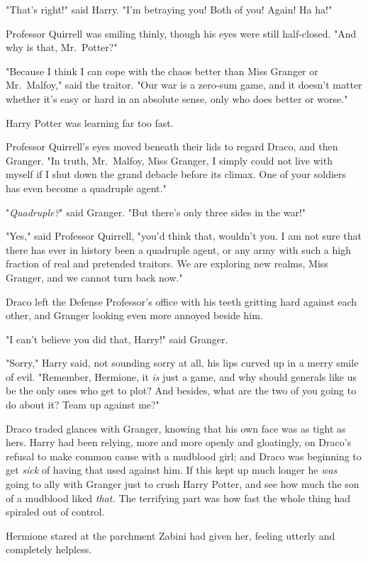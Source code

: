 "That's right!" said Harry. "I'm betraying you! Both of you! Again! Ha ha!"

Professor Quirrell was smiling thinly, though his eyes were still half-closed. 
"And why is that, Mr.~Potter?"

"Because I think I can cope with the chaos better than Miss Granger or 
Mr.~Malfoy," said the traitor. "Our war is a zero-sum game, and it doesn't 
matter whether it's easy or hard in an absolute sense, only who does better or 
worse."

Harry Potter was learning far too fast.

Professor Quirrell's eyes moved beneath their lids to regard Draco, and then 
Granger. "In truth, Mr.~Malfoy, Miss Granger, I simply could not live with 
myself if I shut down the grand debacle before its climax. One of your soldiers 
has even become a quadruple agent."

"\emph{Quadruple?}" said Granger. "But there's only three sides in the war!"

"Yes," said Professor Quirrell, "you'd think that, wouldn't you. I am not sure 
that there has ever in history been a quadruple agent, or any army with such a 
high fraction of real and pretended traitors. We are exploring new realms, Miss 
Granger, and we cannot turn back now."

Draco left the Defense Professor's office with his teeth gritting hard against 
each other, and Granger looking even more annoyed beside him.

"I can't believe you did that, Harry!" said Granger.

"Sorry," Harry said, not sounding sorry at all, his lips curved up in a merry 
smile of evil. "Remember, Hermione, it \emph{is} just a game, and why should 
generals like us be the only ones who get to plot? And besides, what are the 
two of you going to do about it? Team up against me?"

Draco traded glances with Granger, knowing that his own face was as tight as 
hers. Harry had been relying, more and more openly and gloatingly, on Draco's 
refusal to make common cause with a mudblood girl; and Draco was beginning to 
get \emph{sick} of having that used against him. If this kept up much longer he 
\emph{was} going to ally with Granger just to crush Harry Potter, and see how 
much the son of a mudblood liked \emph{that.}
\sbreak
The terrifying part was how fast the whole thing had spiraled out of control.

Hermione stared at the parchment Zabini had given her, feeling utterly and 
completely helpless.

